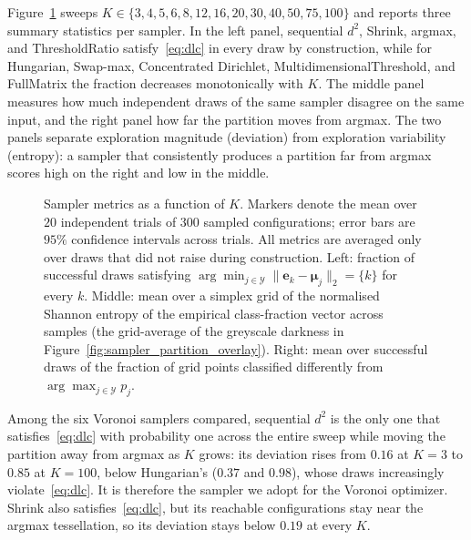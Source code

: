 Figure~\ref{fig:sampler_metrics_vs_k} sweeps $K \in \{3, 4, 5, 6, 8, 12, 16, 20, 30, 40, 50, 75, 100\}$ and reports three summary statistics per sampler. In the left panel, sequential $d^2$, Shrink, argmax, and ThresholdRatio satisfy~\eqref{eq:dlc} in every draw by construction, while for Hungarian, Swap-max, Concentrated Dirichlet, MultidimensionalThreshold, and FullMatrix the fraction decreases monotonically with $K$. The middle panel measures how much independent draws of the same sampler disagree on the same input, and the right panel how far the partition moves from argmax. The two panels separate exploration magnitude (deviation) from exploration variability (entropy): a sampler that consistently produces a partition far from argmax scores high on the right and low in the middle.

\begin{figure}[H]
    \centering
    
    \caption{Sampler metrics as a function of $K$. Markers denote the mean over $20$ independent trials of $300$ sampled configurations; error bars are $95\%$ confidence intervals across trials. All metrics are averaged only over draws that did not raise during construction. Left: fraction of successful draws satisfying $\arg\min_{j \in \mathcal{Y}}\|\mathbf{e}_k-\boldsymbol{\mu}_j\|_2 = \{k\}$ for every $k$. Middle: mean over a simplex grid of the normalised Shannon entropy of the empirical class-fraction vector across samples (the grid-average of the greyscale darkness in Figure~\ref{fig:sampler_partition_overlay}). Right: mean over successful draws of the fraction of grid points classified differently from $\arg\max_{j \in \mathcal{Y}} p_j$.}\label{fig:sampler_metrics_vs_k}
\end{figure}

Among the six Voronoi samplers compared, sequential $d^2$ is the only one that satisfies~\eqref{eq:dlc} with probability one across the entire sweep while moving the partition away from argmax as $K$ grows: its deviation rises from $0.16$ at $K=3$ to $0.85$ at $K=100$, below Hungarian's ($0.37$ and $0.98$), whose draws increasingly violate~\eqref{eq:dlc}. It is therefore the sampler we adopt for the Voronoi optimizer. Shrink also satisfies~\eqref{eq:dlc}, but its reachable configurations stay near the argmax tessellation, so its deviation stays below $0.19$ at every $K$.

